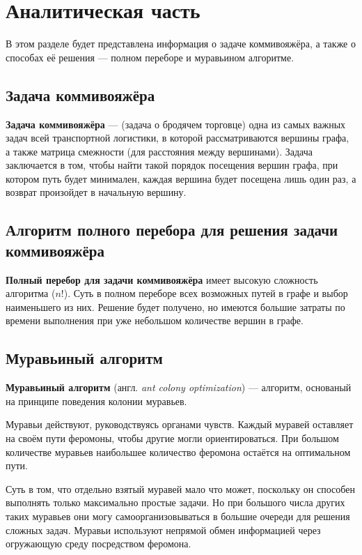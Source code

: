 \chapter{Аналитическая часть}
В этом разделе будет представлена информация о задаче коммивояжёра, а также о способах её решения --- полном переборе и муравьином алгоритме.

\section{Задача коммивояжёра}
\textbf{Задача коммивояжёра} \cite{task}  --- (задача о бродячем торговце) одна из самых важных задач всей транспортной логистики, в которой рассматриваются вершины графа, а также матрица смежности (для расстояния между вершинами). 
Задача заключается в том, чтобы найти такой порядок посещения вершин графа, при котором путь будет минимален, каждая вершина будет посещена лишь один раз, а возврат произойдет в начальную вершину. 

\section{Алгоритм полного перебора для решения задачи коммивояжёра}

\textbf{Полный перебор для задачи коммивояжёра}\cite{full-comb} имеет высокую сложность алгоритма ($n!$). 
Суть в полном переборе всех возможных путей в графе и выбор наименьшего из них. 
Решение будет получено, но имеются большие затраты по времени выполнения при уже небольшом количестве вершин в графе.


\section{Муравьиный алгоритм}

\textbf{Муравьиный алгоритм} (англ. \textit{ant colony optimization})  \cite{full-comb} --- алгоритм, основаный на принципе поведения колонии муравьев.

Муравьи действуют, руководствуясь органами чувств. 
Каждый муравей оставляет на своём пути феромоны, чтобы другие могли ориентироваться. 
При большом количестве муравьев наибольшее количество феромона остаётся на оптимальном пути.

Суть в том, что отдельно взятый муравей мало что может, поскольку он способен выполнять только максимально простые задачи. Но при большого числа других таких муравьев они могу самоорганизовываться в большие очереди для решения сложных задач. Муравьи используют непрямой обмен информацией через огружающую среду посредством феромона.

